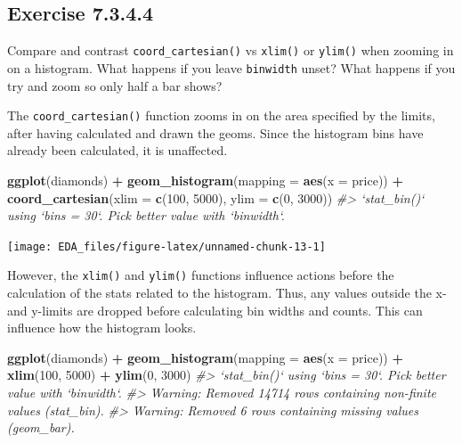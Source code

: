 \documentclass[]{book}
\newenvironment{Shaded}{\begin{snugshade}}{\end{snugshade}}
\newcommand{\CommentTok}[1]{\textcolor[rgb]{0.56,0.35,0.01}{\textit{#1}}}
\newcommand{\DataTypeTok}[1]{\textcolor[rgb]{0.13,0.29,0.53}{#1}}
\newcommand{\DecValTok}[1]{\textcolor[rgb]{0.00,0.00,0.81}{#1}}
\newcommand{\KeywordTok}[1]{\textcolor[rgb]{0.13,0.29,0.53}{\textbf{#1}}}
\newcommand{\NormalTok}[1]{#1}
\newcommand{\OperatorTok}[1]{\textcolor[rgb]{0.81,0.36,0.00}{\textbf{#1}}}
\newcommand{\StringTok}[1]{\textcolor[rgb]{0.31,0.60,0.02}{#1}}
\theoremstyle{plain}
\theoremstyle{remark}
\begin{document}
\hypertarget{exercise-7.3.4.4}{%
\subsection*{\texorpdfstring{Exercise {7.3.4.4}}{Exercise 7.3.4.4}}\label{exercise-7.3.4.4}}

Compare and contrast \texttt{coord\_cartesian()} vs \texttt{xlim()} or \texttt{ylim()} when zooming in on a histogram. What happens if you leave \texttt{binwidth} unset? What happens if you try and zoom so only half a bar shows?

The \texttt{coord\_cartesian()} function zooms in on the area specified by the limits,
after having calculated and drawn the geoms.
Since the histogram bins have already been calculated, it is unaffected.

\begin{Shaded}
\begin{Highlighting}[]
\KeywordTok{ggplot}\NormalTok{(diamonds) }\OperatorTok{+}
\StringTok{  }\KeywordTok{geom_histogram}\NormalTok{(}\DataTypeTok{mapping =} \KeywordTok{aes}\NormalTok{(}\DataTypeTok{x =}\NormalTok{ price)) }\OperatorTok{+}
\StringTok{  }\KeywordTok{coord_cartesian}\NormalTok{(}\DataTypeTok{xlim =} \KeywordTok{c}\NormalTok{(}\DecValTok{100}\NormalTok{, }\DecValTok{5000}\NormalTok{), }\DataTypeTok{ylim =} \KeywordTok{c}\NormalTok{(}\DecValTok{0}\NormalTok{, }\DecValTok{3000}\NormalTok{))}
\CommentTok{#> `stat_bin()` using `bins = 30`. Pick better value with `binwidth`.}
\end{Highlighting}
\end{Shaded}

\begin{center}\texttt{[image: EDA\_files/figure-latex/unnamed-chunk-13-1]} \end{center}

However, the \texttt{xlim()} and \texttt{ylim()} functions influence actions before the calculation
of the stats related to the histogram. Thus, any values outside the x- and y-limits
are dropped before calculating bin widths and counts. This can influence how
the histogram looks.

\begin{Shaded}
\begin{Highlighting}[]
\KeywordTok{ggplot}\NormalTok{(diamonds) }\OperatorTok{+}
\StringTok{  }\KeywordTok{geom_histogram}\NormalTok{(}\DataTypeTok{mapping =} \KeywordTok{aes}\NormalTok{(}\DataTypeTok{x =}\NormalTok{ price)) }\OperatorTok{+}
\StringTok{  }\KeywordTok{xlim}\NormalTok{(}\DecValTok{100}\NormalTok{, }\DecValTok{5000}\NormalTok{) }\OperatorTok{+}
\StringTok{  }\KeywordTok{ylim}\NormalTok{(}\DecValTok{0}\NormalTok{, }\DecValTok{3000}\NormalTok{)}
\CommentTok{#> `stat_bin()` using `bins = 30`. Pick better value with `binwidth`.}
\CommentTok{#> Warning: Removed 14714 rows containing non-finite values (stat_bin).}
\CommentTok{#> Warning: Removed 6 rows containing missing values (geom_bar).}
\end{Highlighting}
\end{Shaded}
\end{document}

